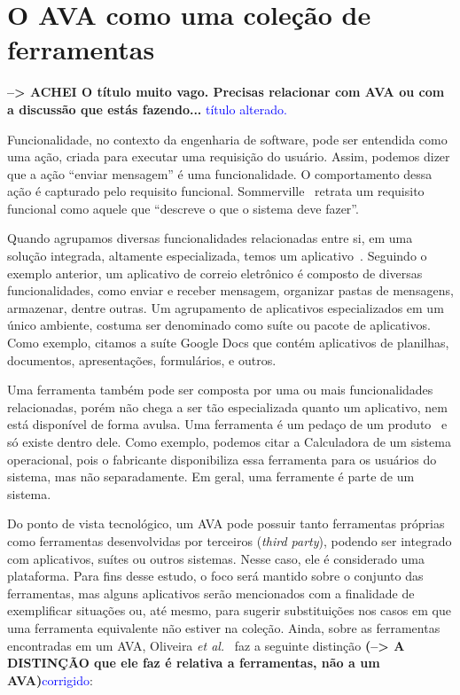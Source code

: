 \section{O AVA como uma coleção de ferramentas}%

\textbf{--> ACHEI O título muito vago. Precisas relacionar com AVA ou com a discussão que estás fazendo...} \textcolor{blue}{título alterado.}

Funcionalidade, no contexto da engenharia de software, pode ser entendida como uma ação, criada para executar uma requisição do usuário. Assim, podemos dizer que a ação ``enviar mensagem'' é uma funcionalidade. O comportamento dessa ação é capturado pelo requisito funcional. Sommerville~\cite{sommerville2011eng} retrata um requisito funcional como aquele que ``descreve o que o sistema deve fazer''. 

Quando agrupamos diversas funcionalidades relacionadas entre si, em uma solução integrada, altamente especializada, temos um aplicativo~\cite{martins@tecnicas}. Seguindo o exemplo anterior, um aplicativo de correio eletrônico é composto de diversas funcionalidades, como enviar e receber mensagem, organizar pastas de mensagens, armazenar, dentre outras. Um agrupamento de aplicativos especializados em um único ambiente, costuma ser denominado como suíte ou pacote de aplicativos. Como exemplo, citamos a suíte Google Docs que contém aplicativos de planilhas, documentos, apresentações, formulários, e outros.

Uma ferramenta também pode ser composta por uma ou mais funcionalidades relacionadas, porém não chega a ser tão especializada quanto um aplicativo, nem está disponível de forma avulsa. Uma ferramenta é um pedaço de um produto~\cite{martins@tecnicas} e só existe dentro dele. Como exemplo, podemos citar a Calculadora de um sistema operacional, pois o fabricante disponibiliza essa ferramenta para os usuários do sistema, mas não separadamente. Em geral, uma ferramente é parte de um sistema.

Do ponto de vista tecnológico, um AVA pode possuir tanto ferramentas próprias como ferramentas desenvolvidas por terceiros (\textit{third party}), podendo ser integrado com aplicativos, suítes ou outros sistemas. Nesse caso, ele é considerado uma plataforma. Para fins desse estudo, o foco será mantido sobre o conjunto das ferramentas, mas alguns aplicativos serão mencionados com a finalidade de exemplificar situações ou, até mesmo, para sugerir substituições nos casos em que uma ferramenta equivalente não estiver na coleção. Ainda, sobre as ferramentas encontradas em um AVA, Oliveira \textit{et al.}~\cite{dotta@ead} faz a seguinte distinção \textbf{(--> A DISTINÇÃO que ele faz é relativa a ferramentas, não a um AVA)}\textcolor{blue}{corrigido}:


